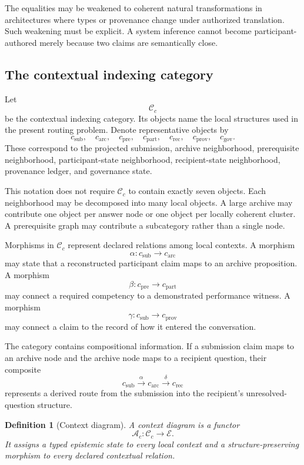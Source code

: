 \documentclass[11pt]{article}
\newtheorem{definition}{Definition}[section]
\theoremstyle{definition}
\newcommand{\C}{\mathcal{C}}
\newcommand{\A}{\mathcal{A}}
\begin{document}
The equalities may be weakened to coherent natural transformations in architectures where types or provenance change under authorized translation. Such weakening must be explicit. A system inference cannot become participant-authored merely because two claims are semantically close.

\subsection{The contextual indexing category}

Let
\[
\C_c
\]
be the contextual indexing category. Its objects name the local structures used in the present routing problem. Denote representative objects by
\[
c_{\mathrm{sub}},
\quad
c_{\mathrm{arc}},
\quad
c_{\mathrm{pre}},
\quad
c_{\mathrm{part}},
\quad
c_{\mathrm{rec}},
\quad
c_{\mathrm{prov}},
\quad
c_{\mathrm{gov}}.
\]
These correspond to the projected submission, archive neighborhood, prerequisite neighborhood, participant-state neighborhood, recipient-state neighborhood, provenance ledger, and governance state.

This notation does not require \(\C_c\) to contain exactly seven objects. Each neighborhood may be decomposed into many local objects. A large archive may contribute one object per answer node or one object per locally coherent cluster. A prerequisite graph may contribute a subcategory rather than a single node.

Morphisms in \(\C_c\) represent declared relations among local contexts. A morphism
\[
\alpha:
c_{\mathrm{sub}}\to c_{\mathrm{arc}}
\]
may state that a reconstructed participant claim maps to an archive proposition. A morphism
\[
\beta:
c_{\mathrm{pre}}\to c_{\mathrm{part}}
\]
may connect a required competency to a demonstrated performance witness. A morphism
\[
\gamma:
c_{\mathrm{sub}}\to c_{\mathrm{prov}}
\]
may connect a claim to the record of how it entered the conversation.

The category contains compositional information. If a submission claim maps to an archive node and the archive node maps to a recipient question, their composite
\[
c_{\mathrm{sub}}
\xrightarrow{\alpha}
c_{\mathrm{arc}}
\xrightarrow{\delta}
c_{\mathrm{rec}}
\]
represents a derived route from the submission into the recipient's unresolved-question structure.

\begin{definition}[Context diagram]
A context diagram is a functor
\[
\A_c:\C_c\to\mathscr E.
\]
It assigns a typed epistemic state to every local context and a structure-preserving morphism to every declared contextual relation.
\end{definition}
\end{document}
